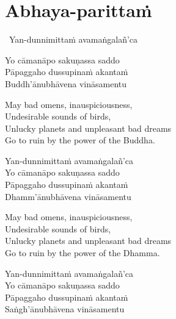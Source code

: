 \suttaRef{[Thai]}

\section{Abhaya-parittaṁ}
\label{abhaya-parittam}

\begin{pali-leader}
  \anglebracketleft\ \hspace{-0.5mm}Yan-dunnimittaṁ avamaṅgalañ'ca \hspace{-0.5mm}\anglebracketright\
\end{pali-leader}
\begin{pali-hangtogether}
  Yo cāmanāpo sakuṇassa saddo\\
  Pāpaggaho dussupinaṁ akantaṁ\\
  Buddh'ānubhāvena vināsamentu
\end{pali-hangtogether}

\begin{english-verses}
  May bad omens, inauspiciousness,\\
  Undesirable sounds of birds,\\
  Unlucky planets and unpleasant bad dreams\\
  Go to ruin by the power of the Buddha.
\end{english-verses}

\begin{pali-hang-continued}
  Yan-dunnimittaṁ avamaṅgalañ'ca\\
  Yo cāmanāpo sakuṇassa saddo\\
  Pāpaggaho dussupinaṁ akantaṁ\\
  Dhamm'ānubhāvena vināsamentu
\end{pali-hang-continued}

\begin{english-verses}
  May bad omens, inauspiciousness,\\
  Undesirable sounds of birds,\\
  Unlucky planets and unpleasant bad dreams\\
  Go to ruin by the power of the Dhamma.
\end{english-verses}

\begin{pali-hang-continued}
  Yan-dunnimittaṁ avamaṅgalañ'ca\\
  Yo cāmanāpo sakuṇassa saddo\\
  Pāpaggaho dussupinaṁ akantaṁ\\
  Saṅgh'ānubhāvena vināsamentu
\end{pali-hang-continued}

